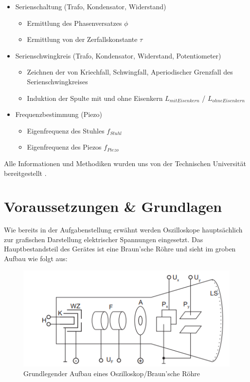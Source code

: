 \documentclass[12pt,a4paper,twoside]{article}
\begin{document}
\begin{itemize}
    \item Serienschaltung (Trafo, Kondensator, Widerstand)
    \begin{itemize}
        \item Ermittlung des Phasenversatzes $\phi$
        \item Ermittlung von der Zerfallskonstante $\tau$
    \end{itemize}
    \item Serienschwingkreis (Trafo, Kondensator, Widerstand, Potentiometer)
    \begin{itemize}
        \item Zeichnen der von Kriechfall, Schwingfall, Aperiodischer Grenzfall des Serienschwingkreises
        \item Induktion der Spulte mit und ohne Eisenkern $L_{mitEisenkern}$ / $L_{ohneEisenkern}$
    \end{itemize}
    \item Frequenzbestimmung (Piezo)
    \begin{itemize}
        \item Eigenfrequenz des Stuhles $f_{Stuhl}$
        \item Eigenfrequenz des Piezos $f_{Piezo}$
    \end{itemize}
\end{itemize}

\noindent
Alle Informationen und Methodiken wurden uns von der Technischen Universität bereitgestellt \cite{teachcenter1}. 



\section{Voraussetzungen \& Grundlagen} %

Wie bereits in der Aufgabenstellung erwähnt werden Oszilloskope hauptsächlich zur grafischen Darstellung elektrischer Spannungen eingesetzt.  
Das Hauptbestandsteil des Gerätes ist eine Braun'sche Röhre und sieht im groben Aufbau wie folgt aus:

\begin{figure}[H]
    \centering
    \includegraphics[width=0.5\linewidth]{nudes/OszilloskopAufbau.png}
    \caption{Grundlegender Aufbau eines Oszilloskop/Braun'sche Röhre \cite{teachcenter1}}
    \label{fig:Aufbau Oszilloskop}
\end{figure}
\end{document}
